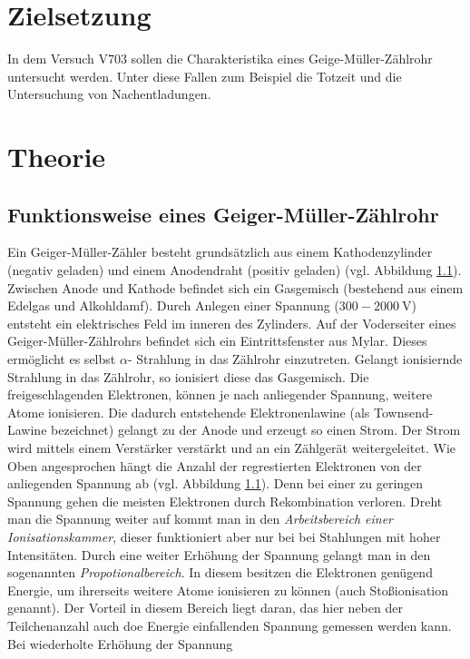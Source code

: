 \setcounter{page}{1}
\section*{Zielsetzung}

In dem Versuch V703 sollen die Charakteristika eines
Geige-Müller-Zählrohr untersucht werden.
Unter diese Fallen zum Beispiel die
Totzeit und die Untersuchung von Nachentladungen.

\section{Theorie}

\subsection{Funktionsweise eines Geiger-Müller-Zählrohr}
Ein Geiger-Müller-Zähler besteht grundsätzlich aus einem
Kathodenzylinder (negativ geladen) und einem Anodendraht (positiv geladen) (vgl. Abbildung \ref{}).
Zwischen Anode und Kathode befindet sich ein Gasgemisch (bestehend aus einem Edelgas
und Alkohldamf).
Durch Anlegen einer Spannung ($300-\SI{2000}{\volt}$) entsteht ein elektrisches
Feld im inneren des Zylinders. Auf der Voderseiter eines Geiger-Müller-Zählrohrs
befindet sich ein Eintrittsfenster aus Mylar. Dieses ermöglicht es selbst $\alpha$-
Strahlung in das Zählrohr einzutreten. Gelangt ionisiernde Strahlung
in das Zählrohr, so ionisiert diese das Gasgemisch. Die freigeschlagenden
Elektronen, können je nach anliegender Spannung, weitere Atome ionisieren.
Die dadurch entstehende Elektronenlawine (als Townsend-Lawine bezeichnet) gelangt zu der Anode und erzeugt so
einen Strom. Der Strom wird mittels einem Verstärker verstärkt und an ein
Zählgerät weitergeleitet. Wie Oben angesprochen hängt die Anzahl der regrestierten
Elektronen von der anliegenden Spannung ab (vgl. Abbildung \ref{}). Denn bei einer zu geringen Spannung
gehen die meisten Elektronen durch Rekombination verloren. Dreht man die Spannung weiter auf
kommt man in den \emph{Arbeitsbereich einer Ionisationskammer}, dieser funktioniert aber nur bei
bei Stahlungen mit hoher Intensitäten. Durch eine weiter Erhöhung der Spannung gelangt man
in den sogenannten \emph{Propotionalbereich}. In diesem besitzen die Elektronen
genügend Energie, um ihrerseits weitere Atome ionisieren zu können (auch Stoßionisation genannt).
Der Vorteil in diesem Bereich liegt daran, das hier neben der Teilchenanzahl auch doe Energie
einfallenden Spannung gemessen werden kann. Bei wiederholte Erhöhung der Spannung
